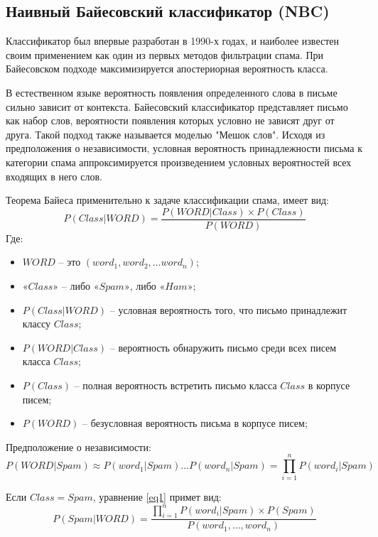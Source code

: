 \subsection{Наивный Байесовский классификатор (NBC)}
Классификатор был впервые разработан в 1990-х годах, и наиболее известен 
своим применением как один из первых методов фильтрации спама. \cite{Bayes}
При Байесовском подходе максимизируется апостериорная вероятность класса.

В естественном языке вероятность появления определенного слова в письме 
сильно зависит от контекста. Байесовский классификатор представляет письмо 
как набор слов, вероятности появления которых условно не зависят друг от друга. 
Такой подход также называется моделью "Мешок слов". 
Исходя из предположения о независимости, условная вероятность принадлежности 
письма к категории спама аппроксимируется произведением условных 
вероятностей всех входящих в него слов.

Теорема Байеса применительно к задаче классификации спама, имеет вид:
\begin{equation}\label{eq1}
    P(Class | WORD) = \frac{P(WORD | Class) \times P(Class)}{P(WORD)}
\end{equation}
Где:
\begin{itemize}
    \item[\bullet] ${WORD}$ -- это $({word_1}, {word_2}, \dots {word_n})$;
    \item[\bullet] ${«Class»}$ -- либо ${«Spam»}$, либо ${«Ham»}$;
    \item[\bullet] ${P(Class | WORD)}$ -- условная вероятность того, что письмо принадлежит классу ${Class}$;
    \item[\bullet] ${P(WORD | Class)}$ -- вероятность обнаружить письмо среди всех писем класса ${Class}$;
    \item[\bullet] ${P(Class)}$ -- полная вероятность встретить письмо класса ${Class}$ в корпусе писем;
    \item[\bullet] ${P(WORD)}$ -- безусловная вероятность письма в корпусе писем;
\end{itemize}

Предположение о независимости:
\begin{equation}\label{eq2}
    P(WORD | Spam) \approx P(word_1 | Spam) \dots P(word_n | Spam) = \prod_{i=1}^n P(word_i | Spam)
\end{equation}

Если ${Class = Spam}$, уравнение \ref{eq1} примет вид:
\begin{equation}\label{eq3}
    P(Spam | WORD) = \frac {\prod_{i=1}^n P(word_i | Spam) \times P(Spam)} {P(word_1, \dots ,word_n)}
\end{equation}

